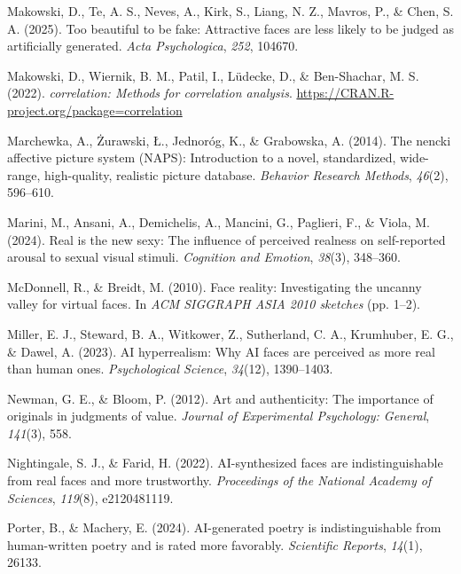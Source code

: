 \documentclass[
  jou,
  floatsintext,
  longtable,
  nolmodern,
  notxfonts,
  notimes,
  colorlinks=true,linkcolor=blue,citecolor=blue,urlcolor=blue]{apa7}
\newlength{\cslhangindent}
\newenvironment{CSLReferences}[2] %
 {\begin{list}{}{%
  \setlength{\itemindent}{0pt}
  \setlength{\leftmargin}{0pt}
  \setlength{\parsep}{0pt}
  \ifodd #1
   \setlength{\leftmargin}{\cslhangindent}
   \setlength{\itemindent}{-1\cslhangindent}
  \fi
  \setlength{\itemsep}{#2\baselineskip}}}
 {\end{list}}
\begin{document}
\begin{CSLReferences}{1}{0}
Makowski, D., Te, A. S., Neves, A., Kirk, S., Liang, N. Z., Mavros, P.,
\& Chen, S. A. (2025). Too beautiful to be fake: Attractive faces are
less likely to be judged as artificially generated. \emph{Acta
Psychologica}, \emph{252}, 104670.

Makowski, D., Wiernik, B. M., Patil, I., Lüdecke, D., \& Ben-Shachar, M.
S. (2022). \emph{{correlation}: Methods for correlation analysis}.
\url{https://CRAN.R-project.org/package=correlation}

Marchewka, A., Żurawski, Ł., Jednoróg, K., \& Grabowska, A. (2014). The
nencki affective picture system (NAPS): Introduction to a novel,
standardized, wide-range, high-quality, realistic picture database.
\emph{Behavior Research Methods}, \emph{46}(2), 596--610.

Marini, M., Ansani, A., Demichelis, A., Mancini, G., Paglieri, F., \&
Viola, M. (2024). Real is the new sexy: The influence of perceived
realness on self-reported arousal to sexual visual stimuli.
\emph{Cognition and Emotion}, \emph{38}(3), 348--360.

McDonnell, R., \& Breidt, M. (2010). Face reality: Investigating the
uncanny valley for virtual faces. In \emph{ACM SIGGRAPH ASIA 2010
sketches} (pp. 1--2).

Miller, E. J., Steward, B. A., Witkower, Z., Sutherland, C. A.,
Krumhuber, E. G., \& Dawel, A. (2023). AI hyperrealism: Why AI faces are
perceived as more real than human ones. \emph{Psychological Science},
\emph{34}(12), 1390--1403.

Newman, G. E., \& Bloom, P. (2012). Art and authenticity: The importance
of originals in judgments of value. \emph{Journal of Experimental
Psychology: General}, \emph{141}(3), 558.

Nightingale, S. J., \& Farid, H. (2022). AI-synthesized faces are
indistinguishable from real faces and more trustworthy.
\emph{Proceedings of the National Academy of Sciences}, \emph{119}(8),
e2120481119.

Porter, B., \& Machery, E. (2024). AI-generated poetry is
indistinguishable from human-written poetry and is rated more favorably.
\emph{Scientific Reports}, \emph{14}(1), 26133.


\end{CSLReferences}
\end{document}
